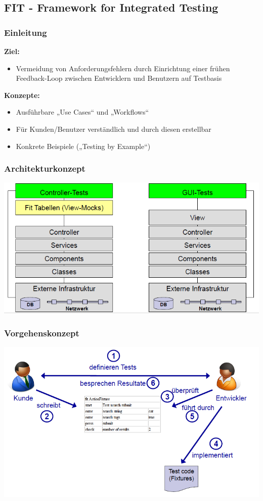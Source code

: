 \documentclass[a4paper,10pt]{article}
\newcommand{\Bold}[1]{\textbf{#1}} %
\begin{document}
\subsection{FIT - Framework for Integrated Testing}
\subsubsection{Einleitung}
\textbf{\Bold Ziel:}
\begin{itemize}
\item Vermeidung von Anforderungsfehlern durch Einrichtung einer frühen Feedback-Loop zwischen Entwicklern und Benutzern auf Testbasis
\end{itemize}
\textbf{\Bold Konzepte:}
\begin{itemize}
\item Ausführbare „Use Cases“ und „Workflows“
\item Für Kunden/Benutzer verst\"andlich und durch diesen erstellbar
\item Konkrete Beispiele („Testing by Example“)
\end{itemize}

\subsubsection{Architekturkonzept}
\includegraphics[scale=0.6]{FIT_Architekturkonzept.png}

\subsubsection{Vorgehenskonzept}
\includegraphics[scale=0.6]{FIT_Vorgehenskonzept.png}
\end{document}
